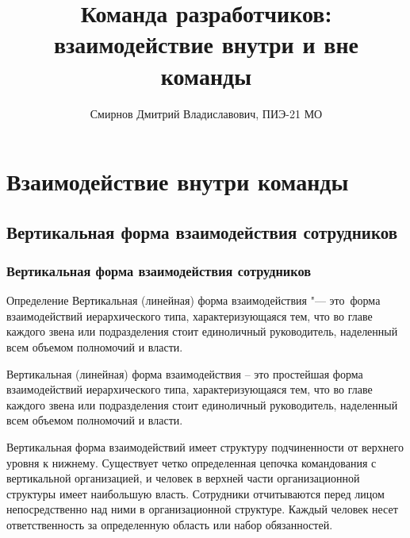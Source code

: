 \documentclass{../industrial-development}
\title{Команда разработчиков: взаимодействие внутри и вне команды}
\author{Смирнов Дмитрий Владиславович, ПИЭ-21 МО}
\date{}
\begin{document}
\begin{frame}
  \titlepage
\end{frame}


\section{Взаимодействие внутри команды}

\subsection{Вертикальная форма взаимодействия сотрудников}

\begin{frame} \frametitle{Вертикальная форма взаимодействия сотрудников}
  \begin{block}{Определение}
Вертикальная (линейная) форма взаимодействия "--- это~форма взаимодействий иерархического типа, характеризующаяся тем, что во главе каждого звена или подразделения стоит единоличный руководитель, наделенный всем объемом полномочий и власти. 
  \end{block}
\end{frame}

\lecturenotes
Вертикальная (линейная) форма взаимодействия –  это простейшая форма взаимодействий иерархического типа, характеризующаяся тем, что во главе каждого звена или подразделения стоит единоличный руководитель, наделенный всем объемом полномочий и власти. 

 Вертикальная форма взаимодействий имеет структуру подчиненности от верхнего уровня к нижнему. Существует четко определенная цепочка командования с вертикальной организацией, и человек в верхней части организационной структуры имеет наибольшую власть. Сотрудники отчитываются перед лицом непосредственно над ними в организационной структуре. Каждый человек несет ответственность за определенную область или набор обязанностей.
\end{document}
